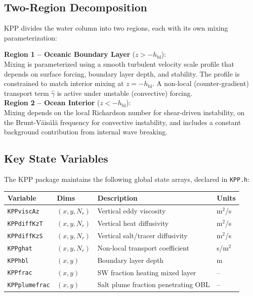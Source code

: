 \documentclass[12pt,letterpaper]{article}
\newcommand{\hbl}{h_{\mathrm{bl}}}
\newcommand{\ghat}{\hat{\gamma}}
\begin{document}
\subsection{Two-Region Decomposition}  
  
KPP divides the water column into two regions, each with its own mixing  
parameterization:  
  
\begin{infobox}  
\textbf{Region 1 -- Oceanic Boundary Layer} ($z > -\hbl$): \\  
Mixing is parameterized using a smooth turbulent velocity scale profile  
that depends on surface forcing, boundary layer depth, and stability.  
The profile is constrained to match interior mixing at $z = -\hbl$.  
A non-local (counter-gradient) transport term $\ghat$ is active under  
unstable (convective) forcing.\\[6pt]  
\textbf{Region 2 -- Ocean Interior} ($z < -\hbl$): \\  
Mixing depends on the local Richardson number for shear-driven  
instability, on the Brunt-V\"{a}is\"{a}l\"{a} frequency for  
convective instability, and includes a constant background contribution  
from internal wave breaking.  
\end{infobox}  
  
\subsection{Key State Variables}  
  
The KPP package maintains the following global state arrays, declared  
in \texttt{KPP.h}:  
  
\begin{longtable}{lp{2cm}p{6cm}l}  
\toprule  
\textbf{Variable} & \textbf{Dims} & \textbf{Description} & \textbf{Units} \\  
\midrule  
\endhead  
\texttt{KPPviscAz}  & $(x,y,N_r)$ & Vertical eddy viscosity & m$^2$/s \\  
\texttt{KPPdiffKzT} & $(x,y,N_r)$ & Vertical heat diffusivity & m$^2$/s \\  
\texttt{KPPdiffKzS} & $(x,y,N_r)$ & Vertical salt/tracer diffusivity & m$^2$/s \\  
\texttt{KPPghat}    & $(x,y,N_r)$ & Non-local transport coefficient & s/m$^2$ \\  
\texttt{KPPhbl}     & $(x,y)$     & Boundary layer depth & m \\  
\texttt{KPPfrac}    & $(x,y)$     & SW fraction heating mixed layer & -- \\  
\texttt{KPPplumefrac}& $(x,y)$   & Salt plume fraction penetrating OBL & -- \\  
\bottomrule  
\end{longtable}  
  
\end{document}
